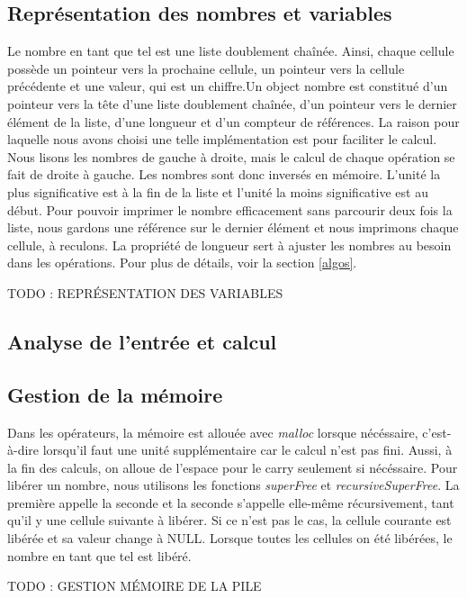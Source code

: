 \documentclass[letterpaper,12pt]{scrartcl}
\begin{document}
		\subsection{Représentation des nombres et variables}
		Le nombre en tant que tel est une liste doublement chaînée. Ainsi, chaque cellule possède un pointeur vers la prochaine cellule, un pointeur vers la cellule précédente et une valeur, qui est un chiffre.Un object nombre est constitué d'un pointeur vers la tête d'une liste doublement chaînée, d'un pointeur vers le dernier élément de la liste, d'une longueur et d'un compteur de références. La raison pour laquelle nous avons choisi une telle implémentation est pour faciliter le calcul. Nous lisons les nombres de gauche à droite, mais le calcul de chaque opération se fait de droite à gauche. Les nombres sont donc inversés en mémoire. L'unité la plus significative est à la fin de la liste et l'unité la moins significative est au début. Pour pouvoir imprimer le nombre efficacement sans parcourir deux fois la liste, nous gardons une référence sur le dernier élément et nous imprimons chaque cellule, à reculons. La propriété de longueur sert à ajuster les nombres au besoin dans les opérations. Pour plus de détails, voir la section \ref{algos}.

		TODO : REPRÉSENTATION DES VARIABLES
        
        \subsection{Analyse de l'entrée et calcul}
            
        
        \subsection{Gestion de la mémoire}
        Dans les opérateurs, la mémoire est allouée avec \textit{malloc} lorsque nécéssaire, c'est-à-dire lorsqu'il faut une unité supplémentaire car le calcul n'est pas fini. Aussi, à la fin des calculs, on alloue de l'espace pour le carry seulement si nécéssaire. Pour libérer un nombre, nous utilisons les fonctions \textit{superFree} et \textit{recursiveSuperFree}. La première appelle la seconde et la seconde s'appelle elle-même récursivement, tant qu'il y une cellule suivante à libérer. Si ce n'est pas le cas, la cellule courante est libérée et sa valeur change à NULL. Lorsque toutes les cellules on été libérées, le nombre en tant que tel est libéré.
         
         TODO : GESTION MÉMOIRE DE LA PILE
        
\end{document}
